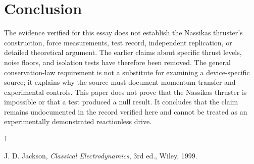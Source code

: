 \documentclass[11pt]{article}
\begin{document}
\section{Conclusion}

The evidence verified for this essay does not establish the Nassikas thruster's construction, force measurements, test record, independent replication, or detailed theoretical argument. The earlier claims about specific thrust levels, noise floors, and isolation tests have therefore been removed. The general conservation-law requirement is not a substitute for examining a device-specific source; it explains why the source must document momentum transfer and experimental controls. This paper does not prove that the Nassikas thruster is impossible or that a test produced a null result. It concludes that the claim remains undocumented in the record verified here and cannot be treated as an experimentally demonstrated reactionless drive.

\begin{thebibliography}{1}

 J. D. Jackson, \emph{Classical Electrodynamics}, 3rd ed., Wiley, 1999.

\end{thebibliography}
\end{document}
